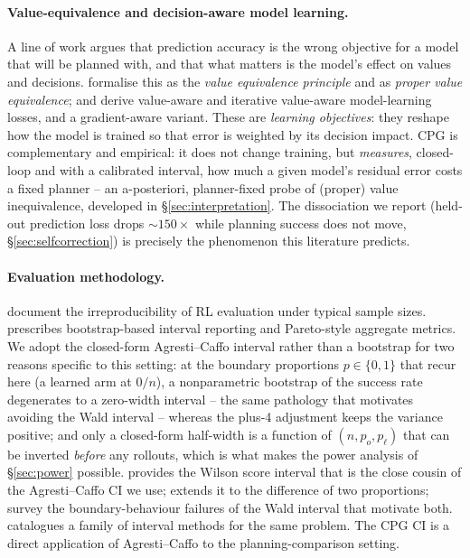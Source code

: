 \documentclass[10pt,letterpaper]{article}
\begin{document}
\paragraph{Value-equivalence and decision-aware model learning.} A line of work argues that prediction accuracy is the wrong objective for a model that will be planned with, and that what matters is the model's effect on values and decisions. \citet{grimm2020value} formalise this as the \emph{value equivalence principle} and \citet{grimm2021proper} as \emph{proper value equivalence}; \citet{farahmand2017value} and \citet{farahmand2018iterative} derive value-aware and iterative value-aware model-learning losses, and \citet{doro2020gradient} a gradient-aware variant. These are \emph{learning objectives}: they reshape how the model is trained so that error is weighted by its decision impact. CPG is complementary and empirical: it does not change training, but \emph{measures}, closed-loop and with a calibrated interval, how much a given model's residual error costs a fixed planner -- an a-posteriori, planner-fixed probe of (proper) value inequivalence, developed in \S\ref{sec:interpretation}. The dissociation we report (held-out prediction loss drops $\sim\!150\times$ while planning success does not move, \S\ref{sec:selfcorrection}) is precisely the phenomenon this literature predicts.

\paragraph{Evaluation methodology.} \citet{henderson2018matters} document the irreproducibility of RL evaluation under typical sample sizes. \citet{agarwal2021precipice} prescribes bootstrap-based interval reporting and Pareto-style aggregate metrics. We adopt the closed-form Agresti--Caffo interval rather than a bootstrap for two reasons specific to this setting: at the boundary proportions $p \in \{0, 1\}$ that recur here (a learned arm at $0/n$), a nonparametric bootstrap of the success rate degenerates to a zero-width interval -- the same pathology that motivates avoiding the Wald interval -- whereas the plus-4 adjustment keeps the variance positive; and only a closed-form half-width is a function of $(n, p_o, p_\ell)$ that can be inverted \emph{before} any rollouts, which is what makes the power analysis of \S\ref{sec:power} possible. \citet{wilson1927} provides the Wilson score interval that is the close cousin of the Agresti--Caffo CI we use; \citet{agresticaffo2000} extends it to the difference of two proportions; \citet{brown2001interval} survey the boundary-behaviour failures of the Wald interval that motivate both. \citet{newcombe1998} catalogues a family of interval methods for the same problem. The CPG CI is a direct application of Agresti--Caffo to the planning-comparison setting.
\end{document}
